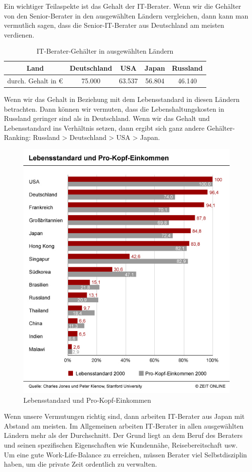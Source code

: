 Ein wichtiger Teilaspekte ist das Gehalt der IT-Berater. Wenn wir die Gehälter von den Senior-Berater in den ausgewählten Ländern vergleichen, dann kann man vermutlich sagen, dass die Senior-IT-Berater aus Deutschland am meisten verdienen.
\begin{table}[htp]

\begin{tabular}{|c|c|c|c|c|}
\hline Land & Deutschland & USA & Japan &  Russland\\ 
\hline durch. Gehalt in € & 75.000 & 63.537 & 56.804 &  46.140\\ 
\hline 
\end{tabular} 
\caption{IT-Berater-Gehälter in ausgewählten Ländern}
\end{table}

Wenn wir das Gehalt in Beziehung mit dem Lebensstandard	in diesen Ländern betrachten. Dann können wir vermuten, dass die Lebenshaltungskosten in Russland  geringer sind als in Deutschland. Wenn wir das Gehalt und Lebensstandard ins Verhältnis setzen, dann ergibt sich ganz andere Gehälter-Ranking: Russland > Deutschland > USA > Japan.
\begin{figure}[ht]
		\centering
		\includegraphics[width=0.7\linewidth]{./images/Lebensstandard-Pro-Kopf-Einkommen}
		\caption{Lebensstandard und Pro-Kopf-Einkommen \cite{LebensStd}}
		\label{fig:LebStdProKEink}
		\end{figure}
Wenn unsere Vermutungen richtig sind, dann arbeiten IT-Berater aus Japan mit Abstand am meisten. Im Allgemeinen arbeiten IT-Berater in allen ausgewählten Ländern mehr als der Durchschnitt. Der Grund liegt an dem Beruf des Beraters und seinen spezifischen Eigenschaften wie Kundennähe, Reisebereitschaft usw. Um eine gute Work-Life-Balance zu erreichen, müssen Berater viel Selbstdisziplin haben, um die private Zeit ordentlich zu verwalten.\\

